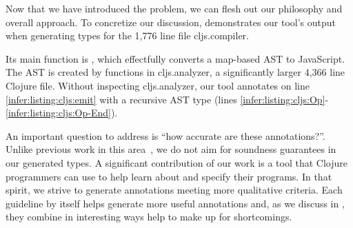\label{infer:sec:overview}

Now that we have introduced the problem,
we can flesh out our philosophy and overall
approach. To concretize our discussion,
 demonstrates our tool's output
when generating types for the 1,776 line file cljs.compiler.

Its main function is , which
effectfully converts a map-based AST
to JavaScript.
The AST is created by functions in cljs.analyzer,
a significantly larger 4,366 line Clojure file.
Without inspecting cljs.analyzer,
our tool annotates  on line \ref{infer:listing:cljs:emit}
with a recursive AST type  (lines \ref{infer:listing:cljs:Op}-\ref{infer:listing:cljs:Op-End}).

%




An important question to address is ``how accurate are these annotations?''.
Unlike previous work in this area~, we do not aim for soundness guarantees
in our generated types. 
A significant contribution of our work is a tool that Clojure programmers
can use to help learn about and specify their programs.
In that spirit, we strive to generate annotations meeting more qualitative criteria.
Each guideline by itself helps generate more useful annotations and,
as we discuss in ,
they combine in interesting ways help to make up for shortcomings.

